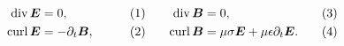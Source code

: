 \documentclass[11pt,a4paper,twoside,openany]{report}
\begin{document}
            \begin{subequations}
                \label{eq:maxwell-sourceless-easy}
                \noindent\centering
                \begin{minipage}{0.45\textwidth}
                    \begin{align}
                        \label{eq:maxwell-sourceless-easy-div-e}
                        \Div \vec E &= 0,
                    \\
                        \label{eq:maxwell-sourceless-easy-curl-e}
                        \Curl \vec E &= -\partial_t\vec B,
                    \end{align}
                \end{minipage}
                \hfill
                \begin{minipage}{0.45\textwidth}
                    \begin{align}
                        \label{eq:maxwell-sourceless-easy-div-b}
                        \Div\vec B &= 0,
                    \\
                        \label{eq:maxwell-sourceless-easy-curl-b}
                        \Curl\vec B &= \mu\sigma\vec E + \mu\epsilon\partial_t\vec E.
                    \end{align}
                \end{minipage}\bigskip
            \end{subequations}
\end{document}

